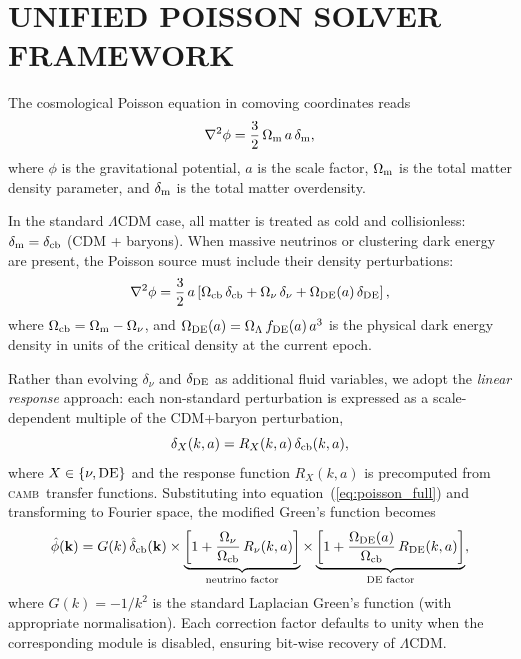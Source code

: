 \documentclass[fleqn,usenatbib]{mnras}
\newcommand{\camb}{\textsc{camb}}
\newcommand{\Onu}{\Omega_\nu}
\newcommand{\Ocb}{\Omega_{\rm cb}}
\newcommand{\Om}{\Omega_{\rm m}}
\newcommand{\Ol}{\Omega_\Lambda}
\newcommand{\Ode}{\Omega_{\rm DE}}
\newcommand{\Rnu}{R_\nu}
\newcommand{\Rde}{R_{\rm DE}}
\begin{document}
\section{UNIFIED POISSON SOLVER FRAMEWORK}
\label{sec:poisson_framework}

The cosmological Poisson equation in comoving coordinates reads
\begin{equation}
\nabla^2 \phi = \frac{3}{2}\,\Om\,a\,\delta_{\rm m},
\label{eq:poisson_standard}
\end{equation}
where $\phi$ is the gravitational potential, $a$ is the scale factor,
$\Om$ is the total matter density parameter, and $\delta_{\rm m}$ is
the total matter overdensity.

In the standard $\Lambda$CDM case, all matter is treated as cold and
collisionless: $\delta_{\rm m} = \delta_{\rm cb}$ (CDM + baryons).
When massive neutrinos or clustering dark energy are present, the
Poisson source must include their density perturbations:
\begin{equation}
\nabla^2 \phi = \frac{3}{2}\,a\left[
  \Ocb\,\delta_{\rm cb}
  + \Onu\,\delta_\nu
  + \Ode(a)\,\delta_{\rm DE}
\right],
\label{eq:poisson_full}
\end{equation}
where $\Ocb = \Om - \Onu$, and $\Ode(a) = \Ol\,f_{\rm DE}(a)\,a^3$
is the physical dark energy density in units of the critical density
at the current epoch.

Rather than evolving $\delta_\nu$ and $\delta_{\rm DE}$ as additional
fluid variables, we adopt the \emph{linear response} approach: each
non-standard perturbation is expressed as a scale-dependent multiple of
the CDM+baryon perturbation,
\begin{equation}
\delta_X(k,a) = R_X(k,a)\,\delta_{\rm cb}(k,a),
\label{eq:linear_response}
\end{equation}
where $X \in \{\nu, {\rm DE}\}$ and the response function $R_X(k,a)$
is precomputed from \camb\ transfer functions.  Substituting into
equation~(\ref{eq:poisson_full}) and transforming to Fourier space,
the modified Green's function becomes
\begin{equation}
\hat{\phi}(\mathbf{k}) = G(k)\,\hat{\delta}_{\rm cb}(\mathbf{k})
  \times \underbrace{\left[1 + \frac{\Onu}{\Ocb}\,\Rnu(k,a)\right]}_{\text{neutrino factor}}
  \times \underbrace{\left[1 + \frac{\Ode(a)}{\Ocb}\,\Rde(k,a)\right]}_{\text{DE factor}},
\label{eq:green_unified}
\end{equation}
where $G(k) = -1/k^2$ is the standard Laplacian Green's function
(with appropriate normalisation).  Each correction factor defaults to
unity when the corresponding module is disabled, ensuring bit-wise
recovery of $\Lambda$CDM.
\end{document}
